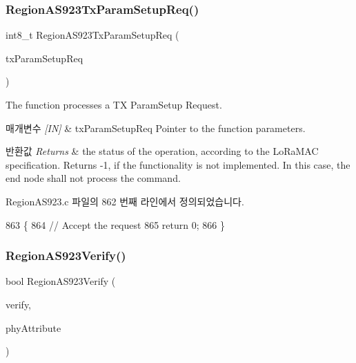 \subsubsection{\texorpdfstring{Region\+A\+S923\+Tx\+Param\+Setup\+Req()}{RegionAS923TxParamSetupReq()}}
{\footnotesize\ttfamily int8\+\_\+t Region\+A\+S923\+Tx\+Param\+Setup\+Req (\begin{DoxyParamCaption}\item[{\mbox{\hyperlink{group___r_e_g_i_o_n_ga26836ef2996e70410e42ef471073f855}{Tx\+Param\+Setup\+Req\+Params\+\_\+t}} $\ast$}]{tx\+Param\+Setup\+Req }\end{DoxyParamCaption})}



The function processes a TX Param\+Setup Request. 


\begin{DoxyParams}{매개변수}
{\em \mbox{[}\+I\+N\mbox{]}} & tx\+Param\+Setup\+Req Pointer to the function parameters.\\
\hline
\end{DoxyParams}

\begin{DoxyRetVals}{반환값}
{\em Returns} & the status of the operation, according to the Lo\+Ra\+M\+AC specification. Returns -\/1, if the functionality is not implemented. In this case, the end node shall not process the command. \\
\hline
\end{DoxyRetVals}


Region\+A\+S923.\+c 파일의 862 번째 라인에서 정의되었습니다.


\begin{DoxyCode}
863 \{
864     \textcolor{comment}{// Accept the request}
865     \textcolor{keywordflow}{return} 0;
866 \}
\end{DoxyCode}
\mbox{\label{group___r_e_g_i_o_n_a_s923_ga6287722023036c70f4a9b1ec43901be5}} 
\subsubsection{\texorpdfstring{Region\+A\+S923\+Verify()}{RegionAS923Verify()}}
{\footnotesize\ttfamily bool Region\+A\+S923\+Verify (\begin{DoxyParamCaption}\item[{\mbox{\hyperlink{group___r_e_g_i_o_n_ga966d97bc2f25df1c09e92e60ef652276}{Verify\+Params\+\_\+t}} $\ast$}]{verify,  }\item[{\mbox{\hyperlink{group___r_e_g_i_o_n_ga9445b07fdf77581ecfaf389970e635f8}{Phy\+Attribute\+\_\+t}}}]{phy\+Attribute }\end{DoxyParamCaption})}



